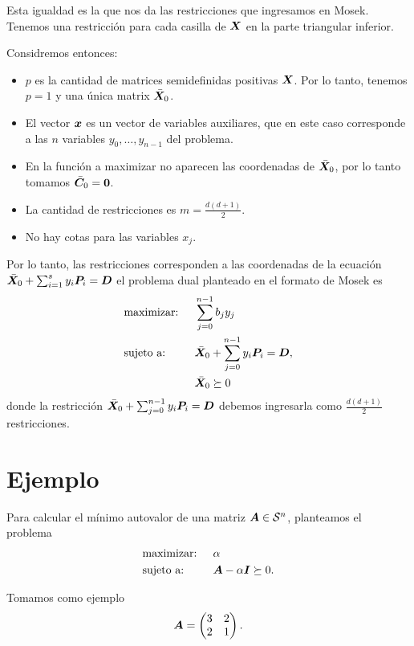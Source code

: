 \documentclass[11pt]{article}
\begin{document}
Esta igualdad es la que nos da las restricciones que ingresamos en Mosek. Tenemos una restricción para cada casilla de $\bm{X}$ en la parte  triangular inferior.

Considremos entonces:
\begin{itemize}
\item $p$ es la cantidad de matrices semidefinidas positivas $\bm{X}$. Por lo tanto, tenemos $p = 1$ y una única matrix $\bar {\bm{X}}_0$.
\item El vector $\bm{x}$ es un vector de variables auxiliares, que en este caso corresponde a las $n$ variables $y_0, \dots, y_{n-1}$ del problema.
\item En la función a maximizar no aparecen las coordenadas de $\bar {\bm{X}}_0$, por lo tanto tomamos $\bar {\bm{C}}_0 = \bm{0}$. 
\item La cantidad de restricciones es $m = \frac{d(d+1)}{2}$.
\item No hay cotas para las variables $x_j$.
\end{itemize}

Por lo tanto, las restricciones corresponden a las coordenadas de la ecuación $\bar {\bm{X}}_0 + \sum_{i=1}^{s} y_i \bm{P}_i = \bm{D}$ el problema dual planteado en el formato de Mosek es
\begin{alignat*}{2}
  & \text{maximizar: } & & \sum_{j=0}^{n-1} b_j y_j  \\
  & \text{sujeto a: }  \quad & & \bar {\bm{X}}_0 + \sum_{j=0}^{n-1} y_i \bm{P}_i = \bm{D}, \\
  & & & \bar {\bm{X}}_0 \succeq 0
\end{alignat*}
donde la restricción $\bar {\bm{X}}_0 + \sum_{j=0}^{n-1} y_i \bm{P}_i = \bm{D} $ debemos ingresarla como $\frac{d(d+1)}{2}$ restricciones.

\section{Ejemplo}
Para calcular el mínimo autovalor de una matriz $\bm{A} \in {\mathcal S}^n$, planteamos el problema
\begin{alignat*}{2}
  & \text{maximizar: } & & \alpha \\
  & \text{sujeto a: } & & \bm{A} - \alpha \bm{I}  \succeq 0.
\end{alignat*}

Tomamos como ejemplo
$$ \bm{A} = \begin{pmatrix}
3 & 2 \\
2 & 1
\end{pmatrix}.
$$
\end{document}
